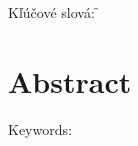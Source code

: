 

\medskip
\noindent
{\sc Kľúčové slová}: \mfkeywordssk
\f
\ifx\draft\undefined

 \chapter*{Abstract}





\medskip
\noindent
{\sc Keywords}: \mfkeywords
\fi


\tableofcontents
\listoftables
\listoffigures
